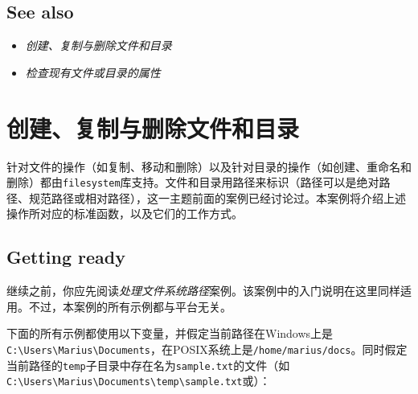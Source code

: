 
\subsection{See also}



\begin{itemize}
\item \textit{创建、复制与删除文件和目录}



\item \textit{检查现有文件或目录的属性}

\end{itemize}



\section{创建、复制与删除文件和目录}



针对文件的操作（如复制、移动和删除）以及针对目录的操作（如创建、重命名和删除）都由\texttt{filesystem}库支持。文件和目录用路径来标识（路径可以是绝对路径、规范路径或相对路径），这一主题前面的案例已经讨论过。本案例将介绍上述操作所对应的标准函数，以及它们的工作方式。



\subsection{Getting ready}



继续之前，你应先阅读\textit{处理文件系统路径}案例。该案例中的入门说明在这里同样适用。不过，本案例的所有示例都与平台无关。



下面的所有示例都使用以下变量，并假定当前路径在Windows上是\texttt{C:\textbackslash{}Users\textbackslash{}Marius\textbackslash{}Documents}，在POSIX系统上是\texttt{/\allowbreak{}home/\allowbreak{}marius/\allowbreak{}docs}。同时假定当前路径的\texttt{temp}子目录中存在名为\texttt{sample.\allowbreak{}txt}的文件（如\texttt{C:\textbackslash{}Users\textbackslash{}Marius\textbackslash{}Documents\textbackslash{}temp\textbackslash{}sample.txt}或）：



